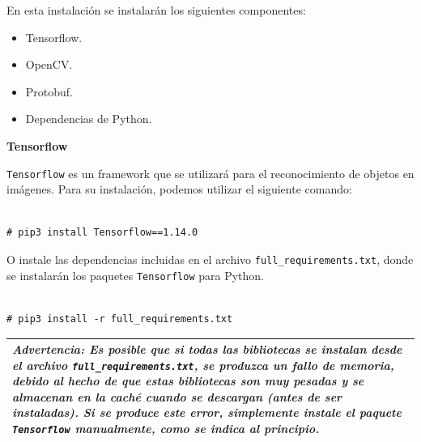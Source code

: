 En esta instalación se instalarán los siguientes componentes:

\vspace{-0.5cm}

\begin{itemize}
\item Tensorflow.
\item OpenCV.
\item Protobuf.
\item Dependencias de Python.
\end{itemize}
    
\textbf{Tensorflow}

\texttt{Tensorflow} es un framework que se utilizará para el reconocimiento de objetos en imágenes. Para su instalación, podemos utilizar el siguiente comando:

\vspace{-1.4cm}

\begin{verbatim}

# pip3 install Tensorflow==1.14.0

\end{verbatim}

\vspace{-1.4cm}

O instale las dependencias incluidas en el archivo \texttt{full\_requirements.txt}, donde se instalarán los paquetes \texttt{Tensorflow} para Python.

\vspace{-1.4cm}

\begin{verbatim}

# pip3 install -r full_requirements.txt

\end{verbatim}

\vspace{-1cm}

\begin{tabular}{|p{15.5cm}|}
	
	\hline
	
	\textit{\textbf{Advertencia}: Es posible que si todas las bibliotecas se instalan desde el archivo \texttt{full\_requirements.txt}, se produzca un fallo de memoria, debido al hecho de que estas bibliotecas son muy pesadas y se almacenan en la caché cuando se descargan (antes de ser instaladas). Si se produce este error, simplemente instale el paquete \texttt{Tensorflow} manualmente, como se indica al principio.}
	\\
	\hline
	
\end{tabular}

